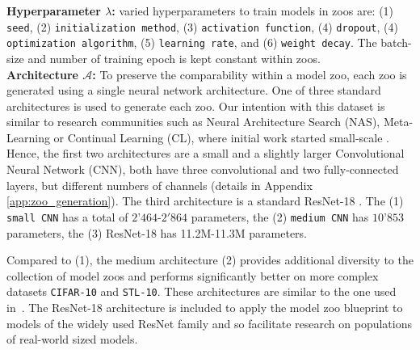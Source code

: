 \textbf{Hyperparameter $\lambda$:}
varied hyperparameters to train models in zoos are: (1) \texttt{seed}, (2) \texttt{initialization method}, (3) \texttt{activation function}, 
(4) \texttt{dropout}, (4) \texttt{optimization algorithm}, (5) \texttt{learning rate}, and (6) \texttt{weight decay}. The batch-size and number of training epoch is kept constant within zoos.
%
\vspace{0.25cm} \\
%
%
%
\textbf{Architecture $\mathcal{A}$:}
To preserve the comparability within a model zoo, each zoo is generated using a single neural 
network architecture. One of three standard architectures is used to generate each zoo. 
Our intention with this dataset is similar to research communities such as Neural Architecture Search (NAS), Meta-Learning or Continual Learning (CL), where initial work started small-scale
\citep{zhmoginovHyperTransformerModelGeneration2022,rameshModelZooGrowing2022}. 
Hence, the first two architectures are a small and a slightly larger Convolutional Neural Network (CNN), both have three convolutional and two fully-connected layers, but different numbers of channels (details in Appendix \ref{app:zoo_generation}). The third architecture is a standard ResNet-18 \citep{heDeepResidualLearning2016}.
The (1) \texttt{small CNN} has a total of $2’464$-$2'864$ 
parameters, the (2) \texttt{medium CNN} has $10’853$ parameters, the (3) ResNet-18 has 11.2M-11.3M parameters. 
%

Compared to (1), the medium architecture (2) provides additional diversity to the collection of model zoos and performs significantly better on more complex datasets \texttt{CIFAR-10} and \texttt{STL-10}. 
These architectures are similar to the one used  in~\citep{schurholtHyperRepresentationsGenerativeModels2022}. 
The ResNet-18 architecture is included to apply the model zoo blueprint to models of the widely used ResNet family and so facilitate research on populations of real-world sized models.

